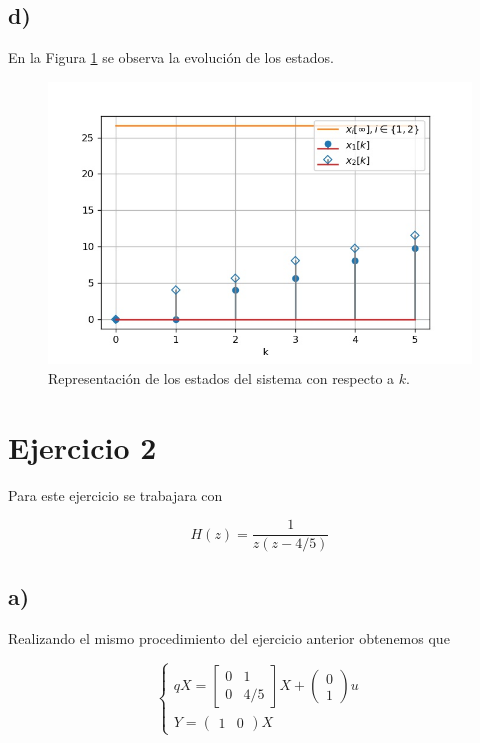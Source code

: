 \documentclass[11pt,a4paper]{article}
\newcommand{\siseq}[1]{ \left\{ \begin{array}{c}
    #1
\end{array} \right. }
\begin{document}
    \subsection*{d)}

    En la Figura \ref{fig:1-d} se observa la evolución de los estados.

    \begin{figure}
        \centering
        \includegraphics[width=.5\textwidth]{Img/1-d.jpg}
        \caption{Representación de los estados del sistema con respecto a $k$.}
        \label{fig:1-d}
    \end{figure}


    \section*{Ejercicio 2}

    Para este ejercicio se trabajara con 

    \begin{equation}
        H(z) = \frac{1}{z(z-4/5)}
    \end{equation}

    \subsection*{a)}

    Realizando el mismo procedimiento del ejercicio anterior obtenemos que 

    \begin{equation}
        \siseq{
            qX = 
            \begin{bmatrix}
                0 & 1 \\ 
                0 & 4/5
            \end{bmatrix} X
            +
            \begin{pmatrix}
                0 \\ 1
            \end{pmatrix}u \\ 
            Y = 
            \begin{pmatrix}
                1 & 0    
            \end{pmatrix} X
        }
    \end{equation}
\end{document}
